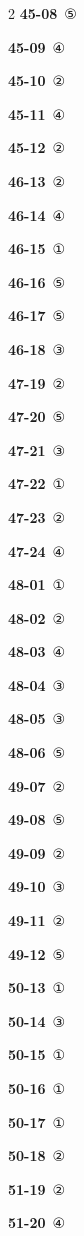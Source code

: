 \documentclass[10pt,a4paper]{article}
\begin{document}
\begin{multicols}{2}
\noindent\textbf{45-08}\ ⑤\par
\noindent\textbf{45-09}\ ④\par
\noindent\textbf{45-10}\ ②\par
\noindent\textbf{45-11}\ ④\par
\noindent\textbf{45-12}\ ②\par
\noindent\textbf{46-13}\ ②\par
\noindent\textbf{46-14}\ ④\par
\noindent\textbf{46-15}\ ①\par
\noindent\textbf{46-16}\ ⑤\par
\noindent\textbf{46-17}\ ⑤\par
\noindent\textbf{46-18}\ ③\par
\noindent\textbf{47-19}\ ②\par
\noindent\textbf{47-20}\ ⑤\par
\noindent\textbf{47-21}\ ③\par
\noindent\textbf{47-22}\ ①\par
\noindent\textbf{47-23}\ ②\par
\noindent\textbf{47-24}\ ④\par
\noindent\textbf{48-01}\ ①\par
\noindent\textbf{48-02}\ ②\par
\noindent\textbf{48-03}\ ④\par
\noindent\textbf{48-04}\ ③\par
\noindent\textbf{48-05}\ ③\par
\noindent\textbf{48-06}\ ⑤\par
\noindent\textbf{49-07}\ ②\par
\noindent\textbf{49-08}\ ⑤\par
\noindent\textbf{49-09}\ ②\par
\noindent\textbf{49-10}\ ③\par
\noindent\textbf{49-11}\ ②\par
\noindent\textbf{49-12}\ ⑤\par
\noindent\textbf{50-13}\ ①\par
\noindent\textbf{50-14}\ ③\par
\noindent\textbf{50-15}\ ①\par
\noindent\textbf{50-16}\ ①\par
\noindent\textbf{50-17}\ ①\par
\noindent\textbf{50-18}\ ②\par
\noindent\textbf{51-19}\ ②\par
\noindent\textbf{51-20}\ ④\par

\end{multicols}
\end{document}

